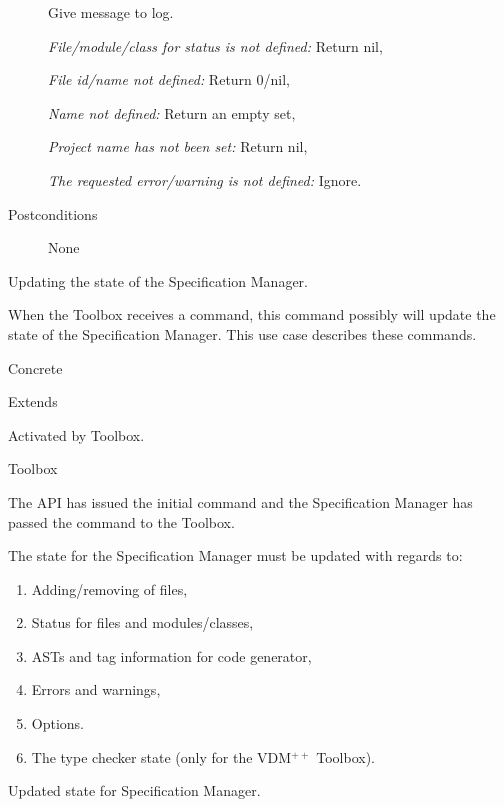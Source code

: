 \documentclass[11pt]{article}
\newcommand{\vdmpp}{{\small VDM}$^{++}$\/}
\newcommand{\specman} {Specification Manager}
\begin{document}
\begin{description}
    Give message to log. \hfill\par
    \textit{File/module/class for status is not defined:} Return nil, \hfill\par
    \textit{File id/name not defined:} Return 0/nil, \hfill\par
    \textit{Name not defined:} Return an empty set, \hfill\par
    \textit{Project name has not been set:} Return nil, \hfill\par
    \textit{The requested error/warning is not defined:} Ignore.
  \item[Postconditions] \hfill\par None
  \end{description}

\begin{description}   
{\large \item[Use Case no. 3:]  Updating the state of the \specman{}.}
\item[Introduction]  \hfill\par When the Toolbox receives a command, this
  command possibly will update the state of the \specman{}. This use
  case describes these commands. 
\item[Type] Concrete          
\item[Relations] Extends
\item[Initialization]  \hfill\par Activated by Toolbox.
\item[Actors]  \hfill\par Toolbox       
\item[Preconditions]  \hfill\par The API has issued the initial
  command and the \specman{} has passed the command to the 
  Toolbox. 
\item[Description]  \hfill\par 
  The state for the \specman{} must be updated with regards to:
  \begin{enumerate}
  \item Adding/removing of files,
  \item Status for files and modules/classes,
  \item ASTs and tag information for code generator,
  \item Errors and warnings,
  \item Options.
  \item The type checker state (only for the \vdmpp{} Toolbox).
  \end{enumerate}
\item[Exeptions]   \hfill\par  
\item[Postconditions]  \hfill\par Updated state for \specman{}.
\end{description}      
\end{document}
